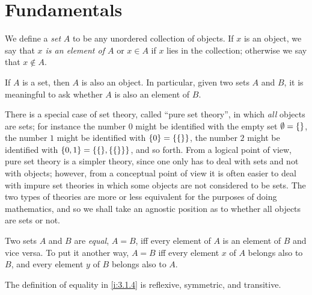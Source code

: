 \section{Fundamentals}\label{i:sec:3.1}

\begin{defn}\label{i:3.1.1}
  We define a \emph{set} \(A\) to be any unordered collection of objects.
  If \(x\) is an object, we say that \emph{\(x\) is an element of \(A\)} or \(x \in A\) if \(x\) lies in the collection;
  otherwise we say that \(x \notin A\).
\end{defn}

\begin{ax}\label{i:3.1}
  If \(A\) is a set, then \(A\) is also an object.
  In particular, given two sets \(A\) and \(B\), it is meaningful to ask whether \(A\) is also an element of \(B\).
\end{ax}

\setcounter{thm}{2}
\begin{rmk}\label{i:3.1.3}
  There is a special case of set theory, called ``pure set theory'', in which \emph{all} objects are sets;
  for instance the number \(0\) might be identified with the empty set \(\emptyset = \left\lbrace\right\rbrace\), the number \(1\) might be identified with \(\left\lbrace0\right\rbrace = \left\lbrace\left\lbrace\right\rbrace\right\rbrace\), the number \(2\) might be identified with \(\set{0, 1} = \set{\set{}, \set{\set{}}}\), and so forth.
  From a logical point of view, pure set theory is a simpler theory, since one only has to deal with sets and not with objects;
  however, from a conceptual point of view it is often easier to deal with impure set theories in which some objects are not considered to be sets.
  The two types of theories are more or less equivalent for the purposes of doing mathematics, and so we shall take an agnostic position as to whether all objects are sets or not.
\end{rmk}

\begin{defn}\label{i:3.1.4}
  Two sets \(A\) and \(B\) are \emph{equal}, \(A = B\), iff every element of \(A\) is an element of \(B\) and vice versa.
  To put it another way, \(A = B\) iff every element \(x\) of \(A\) belongs also to \(B\), and every element \(y\) of \(B\) belongs also to \(A\).
\end{defn}

\begin{ac}\label{i:ac:3.1.1}
  The definition of equality in \cref{i:3.1.4} is reflexive, symmetric, and transitive.
\end{ac}


